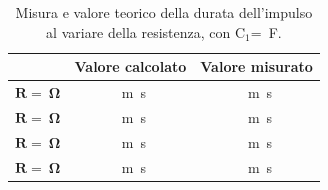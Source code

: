 \documentclass{report}
\begin{document}
\begin{table}[h!]
	\centering
	\begin{tabular}{|c|c|c|}
		\cline{2-3} 
		\multicolumn{1}{c|}{} & \textbf{Valore calcolato} & \textbf{Valore misurato}\\ 
		\hline
		$\mathbf{R = \SI{}{\ohm}}$ & \SI{}{m\second} & \SI{}{m\second} \\ 
		\hline
		$\mathbf{R = \SI{}{\ohm}}$ & \SI{}{m\second} & \SI{}{m\second} \\ 
		\hline
		$\mathbf{R = \SI{}{\ohm}}$ & \SI{}{m\second} & \SI{}{m\second} \\ 
		\hline
		$\mathbf{R = \SI{}{\ohm}}$ & \SI{}{m\second} & \SI{}{m\second} \\ 
		\hline
	\end{tabular}
	\caption{Misura e valore teorico della durata dell'impulso al variare della resistenza, con $\mathrm{C_1}$=\SI{}{\farad}.}
	\label{table:impulsoCvar}
\end{table}

\end{document}
